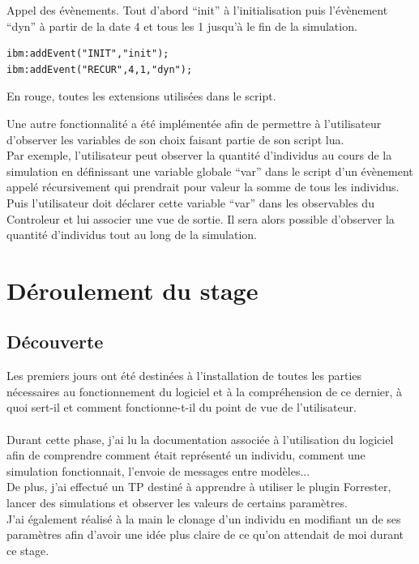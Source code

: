 Appel des évènements. Tout d'abord ``init'' à l'initialisation puis l'évènement ``dyn'' à partir de la date 4 et tous les 1 jusqu'à le fin de la simulation.

\begin{lstlisting}[frame=single]
ibm:addEvent("INIT","init");
ibm:addEvent("RECUR",4,1,"dyn");
\end{lstlisting}

En rouge, toutes les extensions utilisées dans le script.

Une autre fonctionnalité a été implémentée afin de permettre à l'utilisateur d'observer les variables de son choix faisant partie de son script lua.\\
Par exemple, l'utilisateur peut observer la quantité d'individus au cours de la simulation en définissant une variable globale ``var'' dans le  script d'un évènement appelé récursivement qui prendrait pour valeur la somme de tous les individus.\\ Puis l'utilisateur doit déclarer cette variable ``var'' dans les observables du Controleur et lui associer une vue de sortie. Il sera alors possible d'observer la quantité d'individus tout au long de la simulation.
\section{Déroulement du stage}
\subsection{Découverte}
Les premiers jours ont été destinées à l'installation de toutes les parties nécessaires au fonctionnement du logiciel et à la compréhension de ce dernier, à quoi sert-il et comment fonctionne-t-il du point de vue de l'utilisateur.\\
\\
Durant cette phase, j'ai lu la documentation associée à l'utilisation du logiciel afin de comprendre comment était représenté un individu, comment une simulation fonctionnait, l'envoie de messages entre modèles...\\
De plus, j'ai effectué un TP destiné à apprendre à utiliser le plugin Forrester, lancer des simulations et observer les valeurs de certains paramètres.\\
J'ai également réalisé à la main le clonage d'un individu en modifiant un de ses paramètres afin d'avoir une idée plus claire de ce qu'on attendait de moi durant ce stage.
